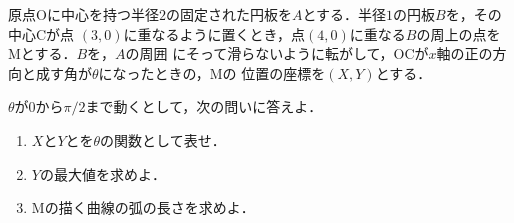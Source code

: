 \documentclass[a4j]{jarticle}
\begin{document}

     \begin{oframed}
     原点Oに中心を持つ半径$2$の固定された円板を$A$とする．半径$1$の円板$B$を，その中心Cが点
     $(3,0)$に重なるように置くとき，点$(4,0)$に重なる$B$の周上の点をMとする．$B$を，$A$の周囲
     にそって滑らないように転がして，OCが$x$軸の正の方向と成す角が$\theta$になったときの，Mの
     位置の座標を$(X,Y)$とする．
          
     $\theta$が$0$から$\pi/2$まで動くとして，次の問いに答えよ．
          \begin{enumerate}[(1)]
          \item $X$と$Y$とを$\theta$の関数として表せ．
          \item $Y$の最大値を求めよ．
          \item Mの描く曲線の弧の長さを求めよ．
          \end{enumerate}     
     \end{oframed}
\end{document}
